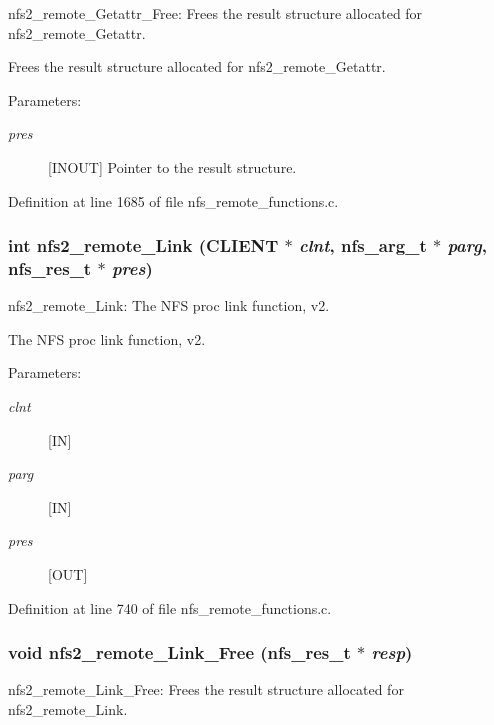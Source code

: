 nfs2\_\-remote\_\-Getattr\_\-Free: Frees the result structure allocated for nfs2\_\-remote\_\-Getattr.

Frees the result structure allocated for nfs2\_\-remote\_\-Getattr.

\begin{Desc}
\item[Parameters:]
\begin{description}
\item[{\em pres}][INOUT] Pointer to the result structure. \end{description}
\end{Desc}


Definition at line 1685 of file nfs\_\-remote\_\-functions.c.
\subsubsection{\setlength{\rightskip}{0pt plus 5cm}int nfs2\_\-remote\_\-Link (CLIENT $\ast$ {\em clnt}, nfs\_\-arg\_\-t $\ast$ {\em parg}, nfs\_\-res\_\-t $\ast$ {\em pres})}\label{group__NFSprocs_ga12}


nfs2\_\-remote\_\-Link: The NFS proc link function, v2.

The NFS proc link function, v2.

\begin{Desc}
\item[Parameters:]
\begin{description}
\item[{\em clnt}][IN] \item[{\em parg}][IN] \item[{\em pres}][OUT] \end{description}
\end{Desc}


Definition at line 740 of file nfs\_\-remote\_\-functions.c.
\subsubsection{\setlength{\rightskip}{0pt plus 5cm}void nfs2\_\-remote\_\-Link\_\-Free (nfs\_\-res\_\-t $\ast$ {\em resp})}\label{group__NFSprocs_ga66}


nfs2\_\-remote\_\-Link\_\-Free: Frees the result structure allocated for nfs2\_\-remote\_\-Link.

